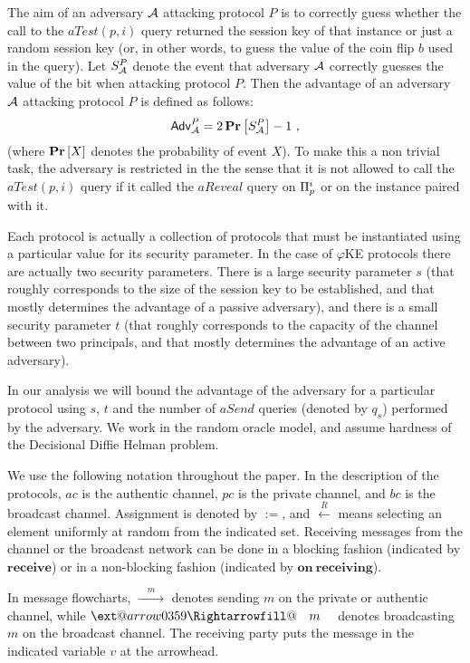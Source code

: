 \documentclass[runningheads,envcountsame,envcountsect,oribibl]{llncs}
\makeatletter
\newcommand{\call}{a}
\newcommand{\assign}{\mathrel{:=}}	\newcommand{\keyw}[1]{\ensuremath{\mathbf{#1}}} \newcommand{\xor}{\oplus}		\newcommand{\Z}{\mathbb{Z}}		\newcommand{\card}[1]{\lvert{#1}\rvert}
\newcommand{\eke}{$\varphi$KE}
\newcommand{\xRightarrow}[2][]{\ext@arrow 0359\Rightarrowfill@{#1}{#2}}
\newcommand{\sendright}[1]{$\xrightarrow{\quad #1\quad}$}
\newcommand{\broadcastright}[1]{$\xRightarrow{\quad #1\quad}$}
\newcommand{\sps}{t}
\newcommand{\spl}{s}
\makeatother
\begin{document}
The aim of an adversary ${\cal{A}}$ attacking protocol $P$ is to correctly guess
whether the call to the $\call{Test}(p,i)$ query returned the session key
of that instance or just a random session key (or, in other words, to guess the
value of the coin flip $b$ used in the query). Let $S_{{\cal{A}}}^P$ denote the
event that adversary ${\cal{A}}$ correctly guesses the value of the bit when
attacking protocol $P$. 
Then the advantage of an adversary ${\cal{A}}$ attacking protocol $P$ is defined as
follows: 
\[
  \text{\textsf{Adv}}_{{\cal{A}}}^P = 2 \, \mathord{\textbf{Pr}}\left[S_{{\cal{A}}}^P\right] - 1~,
\]
(where $\mathord{\textbf{Pr}}\left[X\right]$ denotes the probability of event $X$).
To make this a non trivial task, the adversary is restricted in the the sense
that it is not allowed to call the $\call{Test}(p,i)$ query if it called the
$\call{Reveal}$ query on $\Pi_{p}^{i}$ or on the instance paired with it.

Each protocol is actually a collection of protocols that must be instantiated
using a particular value for its security parameter. In the case of \eke{}
protocols there are actually two security parameters. There is a 
large security parameter $\spl$ (that roughly corresponds to the size of the
session key to be established, and that mostly determines the advantage of a
passive adversary), and there is a small security parameter $\sps$
(that roughly corresponds to the capacity of the channel between two
principals, and that mostly determines the advantage of an active adversary).

In our analysis we will bound the advantage of the adversary for a particular
protocol using $\spl$, $\sps$ and the number of $\call{Send}$ queries (denoted
by $q_s$) performed by the adversary. We work in the random oracle model, and
assume hardness of the Decisional Diffie Helman problem.

We use the following notation throughout the paper. In the description of the
protocols, $ac$ is the authentic channel, $pc$ is the private channel, and $bc$
is the broadcast channel. Assignment is denoted by $\assign$, and
$\overset{R}{\leftarrow}$ means selecting an element uniformly at random from
the indicated set. Receiving messages from the channel or the broadcast network
can be done in a blocking fashion (indicated by \keyw{receive}) or
in a non-blocking fashion (indicated by \keyw{on\ receiving}).

In message flowcharts, \sendright{m} denotes sending $m$ on the private or 
authentic channel, while  \broadcastright{m} denotes broadcasting $m$
on the broadcast channel. The receiving party puts the message in the indicated
variable $v$ at the arrowhead. 
\end{document}
